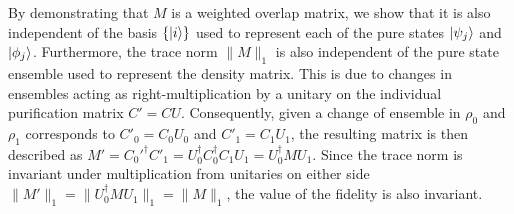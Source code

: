 \documentclass[reprint,amsmath,amssymb,aps,prl,floatfix,groupedaddress,superscriptaddress]{revtex4-2}
\begin{document}
By demonstrating that $M$ is a weighted overlap matrix, we show that it is also independent of the basis $\{\ket{i}\}$ used to represent each of the pure states $\ket{\psi_j}$ and $\ket{\phi_j}$.
Furthermore, the trace norm $\|M\|_1$ is also independent of the pure state ensemble used to represent the density matrix. This is due to changes in ensembles acting as right-multiplication by a unitary on the individual purification matrix $C' = CU$. Consequently, given a change of ensemble in $\rho_0$ and $\rho_1$ corresponds to $C'_0 = C_0U_0$ and $C'_1 = C_1U_1$, the resulting matrix is then described as  $M' = C_0'^\dagger C'_1 = U_0^\dagger C_0^\dagger C_1 U_1 = U_0^\dagger MU_1$. Since the trace norm is invariant under multiplication from unitaries on either side $\|M'\|_1 = \|U_0^\dagger M U_1 \|_1 = \|M\|_1$, the value of the fidelity is also invariant.
\end{document}
